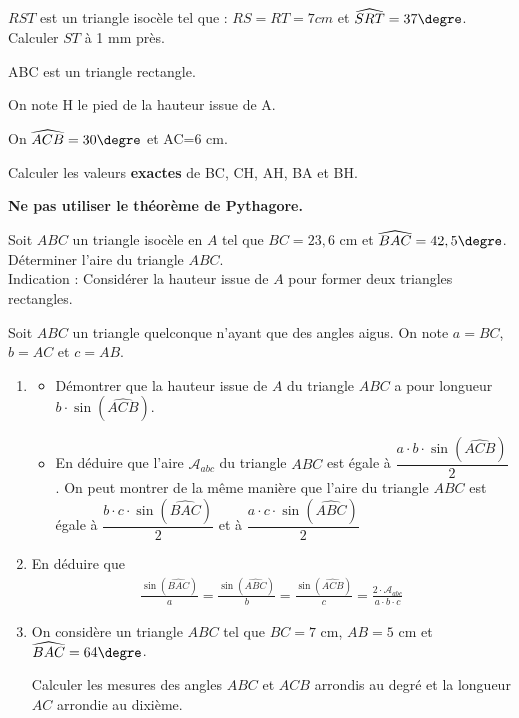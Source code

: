 \begin{exercice}
$RST$ est un triangle isocèle tel que : $RS=RT=7 cm$ et $\widehat{SRT}=37\textrm{\degre}$.\\
Calculer $ST$ à 1 mm près.
\end{exercice}

\begin{exercice}
ABC est un triangle rectangle. 

On note H le pied de la hauteur issue de A.

On $\widehat{ACB}=30\textrm{\degre}$ et AC=6 cm.

Calculer les valeurs \textbf{exactes} de BC, CH, AH, BA et BH.

\textbf{Ne pas utiliser le théorème de Pythagore.}
\end{exercice}

\begin{exercice}
Soit $ABC$ un triangle isocèle en $A$ tel que $BC=23,6$ cm et $\widehat{BAC}=42,5\textrm{\degre}$.\\
Déterminer l'aire du triangle $ABC$.\\
Indication : Considérer la hauteur issue de $A$ pour former deux triangles rectangles.
\end{exercice}

\begin{exercice}
Soit $ABC$ un triangle quelconque n'ayant que des angles aigus. On note $a=BC$, $b=AC$ et $c=AB$.
\begin{enumerate}
\item
\begin{itemize}
\item Démontrer que la hauteur issue de $A$ du triangle $ABC$ a pour longueur $b\cdot \sin(\widehat{ACB})$.
\item En déduire que l'aire $\mathcal{A}_{abc}$ du triangle $ABC$ est égale à $\dfrac{a\cdot b\cdot \sin(\widehat{ACB})}{2}$.
On peut montrer de la même manière que l'aire du triangle $ABC$ est égale à $\dfrac{b\cdot c\cdot \sin(\widehat{BAC})}{2}$ et à $\dfrac{a\cdot c\cdot \sin(\widehat{ABC})}{2}$
\end{itemize}
\item En déduire que 
\begin{align*}
\frac{\sin(\widehat{BAC})}{a}=\frac{\sin(\widehat{ABC})}{b}=\frac{\sin(\widehat{ACB})}{c}=\frac{2\cdot \mathcal{A}_{abc}}{a\cdot b\cdot c}
\end{align*}
\item On considère un triangle $ABC$ tel que $BC=7$ cm, $AB=5$ cm et $\widehat{BAC}=64\textrm{\degre}$.

Calculer les mesures des angles $ABC$ et $ACB$ arrondis au degré et la longueur $AC$ arrondie au dixième. 
\end{enumerate}
\end{exercice}

